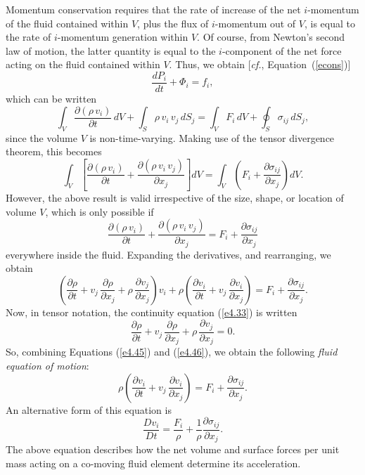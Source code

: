 Momentum conservation requires  that the rate of
increase of the net $i$-momentum of the fluid contained within $V$, plus the flux of $i$-momentum out of $V$, is equal to the rate of $i$-momentum generation
within $V$. Of course, from Newton's second law of motion, the latter quantity is equal to the $i$-component
of the net force acting on the fluid contained within $V$. Thus, we obtain [{\em cf.}, Equation~(\ref{econs})] 
\begin{equation}
\frac{dP_i}{dt} + \Phi_i = f_i,
\end{equation}
which can be written
\begin{equation}
\int_V \frac{\partial(\rho\,v_i)}{\partial t}\,dV +\int_S\rho\,v_i\,v_j\,dS_j =  \int_V F_i\,dV + \oint_S \sigma_{ij}\,dS_j,
\end{equation}
since the volume $V$ is non-time-varying. 
Making use of the tensor divergence theorem, this becomes 
\begin{equation}
\int_V\left[\frac{\partial (\rho\,v_i)}{\partial t} + \frac{\partial(\rho\,v_i\,v_j)}{\partial x_j}\right]dV = 
\int_V\left(F_i + \frac{\partial\sigma_{ij}}{\partial x_j}\right)dV.
\end{equation}
However, the above result is valid irrespective of the size, shape, or location of  volume $V$, which is only
possible if
\begin{equation}
\frac{\partial (\rho\,v_i)}{\partial t} + \frac{\partial(\rho\,v_i\,v_j)}{\partial x_j} = F_i + \frac{\partial\sigma_{ij}}{\partial x_j}
\end{equation}
everywhere inside the fluid. Expanding the derivatives, and rearranging, we obtain
\begin{equation}\label{e4.45}
\left(\frac{\partial\rho}{\partial t} + v_j\,\frac{\partial\rho}{\partial x_j} +\rho\, \frac{\partial v_j}{\partial x_j}\right)v_i
+ \rho\left(\frac{\partial v_i}{\partial t} + v_j\,\frac{\partial v_i}{\partial x_j}\right)= F_i + \frac{\partial\sigma_{ij}}{\partial x_j}.
\end{equation}
Now, in tensor notation, the continuity equation (\ref{e4.33})  is written
\begin{equation}\label{e4.46}
\frac{\partial\rho}{\partial t} + v_j\,\frac{\partial\rho}{\partial x_j} + \rho\,\frac{\partial v_j}{\partial x_j}=0.
\end{equation}
So, combining Equations (\ref{e4.45}) and (\ref{e4.46}), we obtain the following  {\em fluid equation of motion}:
\begin{equation}
 \rho\left(\frac{\partial v_i}{\partial t} + v_j\,\frac{\partial v_i}{\partial x_j}\right)= F_i + \frac{\partial\sigma_{ij}}{\partial x_j}.
\end{equation} 
An alternative form of this equation  is
\begin{equation}\label{e4.48}
\frac{D v_i}{Dt} =  \frac{F_i}{\rho} + \frac{1}{\rho}\frac{\partial\sigma_{ij}}{\partial x_j}.
\end{equation}
The above equation describes how the   net volume and surface forces per unit mass acting on  a co-moving fluid element determine its acceleration.

